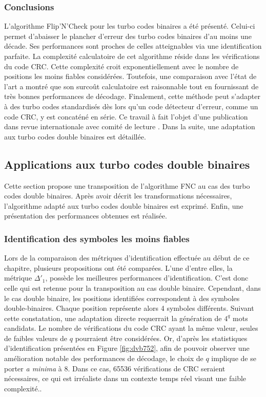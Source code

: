 \subsubsection{Conclusions}
L'algorithme Flip'N'Check pour les turbo codes binaires a été présenté. Celui-ci permet d'abaisser le plancher d'erreur 
des turbo codes binaires d'au moins une décade. Ses performances sont proches de celles atteignables via une 
identification parfaite. La complexité calculatoire de cet algorithme réside dans les vérifications du code CRC. Cette 
complexité croit exponentiellement avec le nombre de positions les moins fiables considérées. Toutefois, une 
comparaison avec l'état de l'art a montré que son surcoût calculatoire est raisonnable tout en fournissant de très bonnes 
performances de décodage. Finalement, cette méthode peut s'adapter à des turbo codes standardisés dès lors qu'un code 
détecteur d'erreur, comme un code CRC, y est concaténé en série. Ce travail à fait l'objet d'une publication dans revue
internationale avec comité de lecture . Dans la suite, une adaptation aux turbo codes double binaires est détaillée.


\subsection{Applications aux turbo codes double binaires}
Cette section propose une transposition de l'algorithme FNC au cas des turbo codes double binaires. Après avoir décrit 
les transformations nécessaires, l'algorithme adapté aux turbo codes double binaires est exprimé. Enfin, une présentation 
des performances obtenues est réalisée.
\subsubsection{Identification des symboles les moins fiables}
Lors de la comparaison des métriques d'identification effectuée au début de ce chapitre, plusieurs propositions ont été 
comparées. L'une d'entre elles, la métrique $\Delta'_1$, possède les meilleures performances d'identification. C'est donc
celle qui est retenue pour la transposition au cas double binaire. Cependant, dans le cas double binaire, les positions identifiées correspondent 
à des symboles double-binaires. Chaque position représente alors 4 symboles différents. Suivant cette constatation, une adaptation directe 
requerrait la génération de $4^q$ mots candidats. Le nombre de vérifications du code CRC ayant la même valeur, 
seules de faibles valeurs de $q$ pourraient être considérées. Or, d'après les statistiques d'identification présentées en Figure 
\ref{fig:dvb752}, afin de pouvoir observer une amélioration notable des performances de décodage, le choix de $q$ implique 
de se porter \textit{a minima} à 8. Dans ce cas, 65536 vérifications de CRC seraient nécessaires, ce qui est 
irréaliste dans un contexte temps réel visant une faible complexité..

